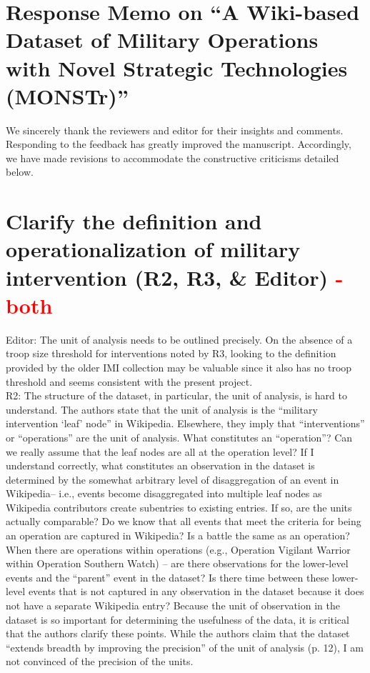 \documentclass[fleqn,12pt]{article}
\date{}
\begin{document}
\thispagestyle{empty}
\setcounter{page}{0}




\section*{Response Memo on ``A Wiki-based Dataset of Military Operations with Novel Strategic Technologies (MONSTr)''} 
We sincerely thank the reviewers and editor for their insights and comments. Responding to the feedback has greatly improved the manuscript. Accordingly, we have made revisions to accommodate the constructive criticisms detailed below.
\tableofcontents

\clearpage  

\section{Clarify the definition and operationalization of military intervention (R2, R3, \& Editor) \textcolor{red}{ - both}}
Editor: The unit of analysis needs to be outlined precisely. On the absence of a troop size threshold for interventions noted by R3, looking to the definition provided by the older IMI collection may be valuable since it also has no troop threshold and seems consistent with the present project. \\

\noindent 
R2: The structure of the dataset, in particular, the unit of analysis, is hard to understand. The authors state that the unit of analysis is the “military intervention ‘leaf’ node” in Wikipedia. Elsewhere, they imply that “interventions” or “operations” are the unit of analysis. What constitutes an “operation”? Can we really assume that the leaf nodes are all at the operation level? If I understand correctly, what constitutes an observation in the dataset is determined by the somewhat arbitrary level of disaggregation of an event in Wikipedia– i.e., events become disaggregated into multiple leaf nodes as Wikipedia contributors create subentries to existing entries. If so, are the units actually comparable? Do we know that all events that meet the criteria for being an operation are captured in Wikipedia? Is a battle the same as an operation?   When there are operations within operations (e.g., Operation Vigilant Warrior within Operation Southern Watch) – are there observations for the lower-level events and the “parent” event in the dataset? Is there time between these lower-level events that is not captured in any observation in the dataset because it does not have a separate Wikipedia entry? Because the unit of observation in the dataset is so important for determining the usefulness of the data, it is critical that the authors clarify these points. While the authors claim that the dataset “extends breadth by improving the precision” of the unit of analysis (p. 12), I am not convinced of the precision of the units. \\
\end{document}
